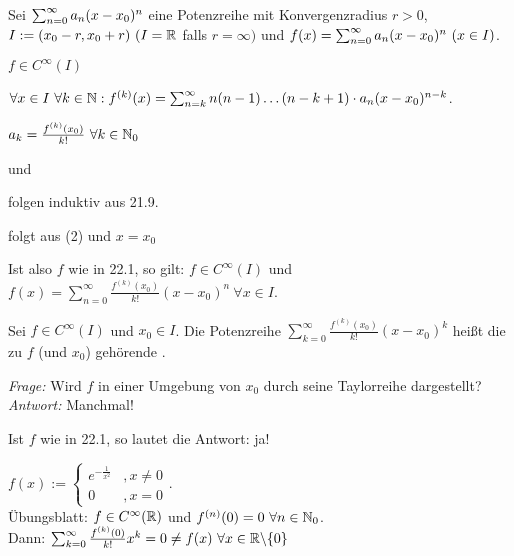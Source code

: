 \documentclass[a4paper,twoside,DIV15,BCOR12mm]{scrbook}
\begin{document}
\begin{satz}
Sei $\sum_{n=0}^{\infty}{a_n(x-x_0)^n}$ eine Potenzreihe mit Konvergenzradius $r>0$, $I:= (x_0-r,x_0+r)\ (I=\mathbb{R}$ falls $r=\infty)$ und $f(x) = \sum_{n=0}^{\infty}{a_n(x-x_0)^n}\ (x\in I)$.
\begin{liste}
\item $f\in C^\infty(I)$
\item $\forall x \in I\ \forall k\in\mathbb{N}: f^{(k)}(x) = \sum_{n=k}^\infty n(n-1)\ldots(n-k+1)\cdot a_n(x-x_0)^{n-k}$.
\item $a_k = \frac{f^{(k)}(x_0)}{k!} \ \forall k \in \mathbb{N}_0$
\end{liste}
\end{satz}

\begin{beweise}
\item und
\item folgen induktiv aus 21.9.
\item folgt aus (2) und $x=x_0$
\end{beweise}

\begin{motivation}
Ist also $f$ wie in 22.1, so gilt: $f\in C^\infty(I)$ und $f(x)=\sum_{n=0}^\infty \frac{f^{(k)}(x_0)}{k!}(x-x_0)^n \ \forall x \in I$.
\end{motivation}

\begin{definition}
Sei $f\in C^\infty(I)$ und $x_0 \in I$. Die Potenzreihe $\sum_{k=0}^\infty \frac{f^{(k)}(x_0)}{k!}(x-x_0)^k$ heißt die zu $f$ (und $x_0$) gehörende .
\end{definition}

\begin{motivation}
\emph{Frage:} Wird $f$ in einer Umgebung von $x_0$ durch seine Taylorreihe dargestellt? \\
\emph{Antwort:} Manchmal!
\end{motivation}

\begin{beispiele}
\item Ist $f$ wie in 22.1, so lautet die Antwort: ja!
\item $f(x):= \begin{cases} e^{-\frac{1}{x^2}} &, x\ne0 \\ 0 &, x= 0\end{cases}$. \\
Übungsblatt: $f \in C^\infty(\mathbb{R})$ und $f^{(n)}(0)=0\ \forall n\in\mathbb{N}_0$. \\
Dann: $\sum_{k=0}^\infty \frac{f^{(k)}(0)}{k!}x^k = 0 \ne f(x) \ \forall x\in\mathbb{R}\backslash\{0\}$
\end{beispiele}
\end{document}
